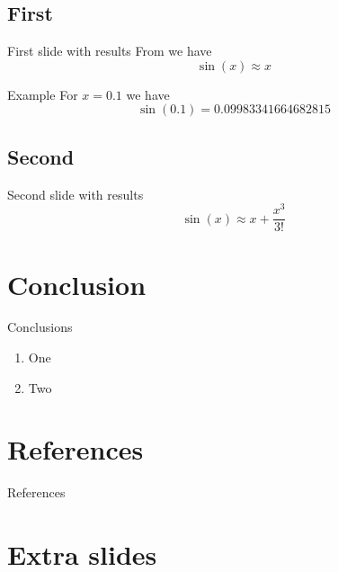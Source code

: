 \documentclass[
aspectratio=169,
16pt,
xcolor={dvipsnames} %
]{beamer}
\begin{document}
\subsection{First}
\begin{frame}[c]{First slide with results}
	From  we have
	\[
		\sin(x) \approx x
	\]
	\begin{block}{Example}
		For $x = 0.1$ we have 
		\[
			\sin (0.1) = 0.09983341664682815
		\]
	\end{block}
\end{frame}

\subsection{Second}
\begin{frame}[c]{Second slide with results}
	\[
	\sin(x) \approx x + \frac{x^3}{3!}
	\]
\end{frame}

\section{Conclusion}
\begin{frame}[c]{Conclusions}
	\begin{enumerate}
		\item One
		\item Two
	\end{enumerate}
\end{frame}

\section{References}
\begin{frame}[c]{References}
\printbibliography
\end{frame}


\section{Extra slides}
\end{document}
